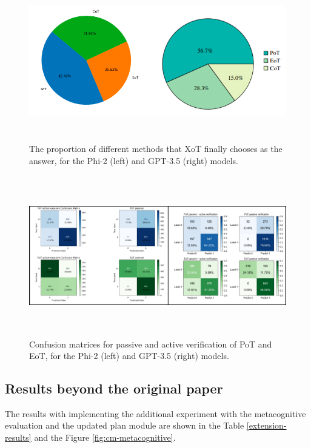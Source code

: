 \documentclass[10pt]{article} %
\begin{document}
  \begin{figure}[h]
    \begin{center}
    \includegraphics[height=7cm]{graphs/graph1.png}
    \end{center}
    \caption{The proportion of different methods that XoT finally chooses as the answer, for the Phi-2 (left) and GPT-3.5 (right) models.}
    \label{fig:proportion}
    \end{figure}

    \begin{figure}[h]
      \begin{center}
      \includegraphics[height=7cm,width=16.5cm]{graphs/cm_merged.png}
      \end{center}
      \caption{Confusion matrices for passive and active verification of PoT and EoT, for the Phi-2 (left) and GPT-3.5 (right) models.}
      \label{fig:cm}
      \end{figure}


\subsection{Results beyond the original paper}
The results with implementing the additional experiment with the metacognitive evaluation and the updated plan module are shown in the Table \ref{extension-results} and the Figure \ref{fig:cm-metacognitive}.
\end{document}

